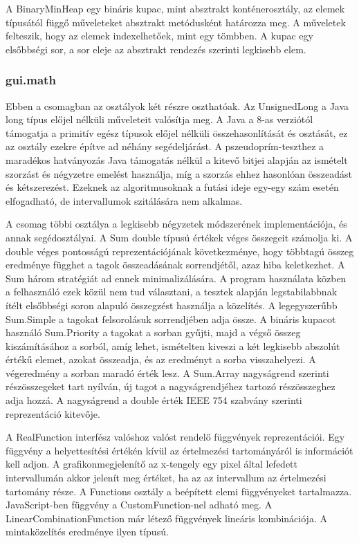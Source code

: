 A BinaryMinHeap egy bináris kupac, mint absztrakt konténerosztály, az elemek típusától függő műveleteket absztrakt metódusként határozza meg.
A műveletek felteszik, hogy az elemek indexelhetőek, mint egy tömbben.
A kupac egy elsőbbségi sor, a sor eleje az absztrakt rendezés szerinti legkisebb elem.

\subsubsection{gui.math}

Ebben a csomagban az osztályok két részre oszthatóak.
Az UnsignedLong a Java long típus előjel nélküli műveleteit valósítja meg.
A Java a 8-as verziótól támogatja a primitív egész típusok előjel nélküli összehasonlítását és osztását, ez az osztály ezekre építve ad néhány segédeljárást.
A pszeudoprím-teszthez a maradékos hatványozás Java támogatás nélkül a kitevő bitjei alapján az ismételt szorzást és négyzetre emelést használja, míg a szorzás ehhez hasonlóan összeadást és kétszerezést. Ezeknek az algoritmusoknak a futási ideje egy-egy szám esetén elfogadható, de intervallumok szitálására nem alkalmas.

A csomag többi osztálya a legkisebb négyzetek módszerének implementációja, és annak segédosztályai.
A Sum double típusú értékek véges összegeit számolja ki.
A double véges pontosságú reprezentációjának következménye, hogy többtagú összeg eredménye függhet a tagok összeadásának sorrendjétől, azaz hiba keletkezhet.
A Sum három stratégiát ad ennek minimalizálására.
A program használata közben a felhasználó ezek közül nem tud választani, {\color{red}a tesztek alapján legstabilabbnak ítélt elsőbbségi soron alapuló} összegzést használja a közelítés.
A legegyszerűbb Sum.Simple a tagokat felsorolásuk sorrendjében adja össze. 
A bináris kupacot használó Sum.Priority a tagokat a sorban gyűjti, majd a végső összeg kiszámításához a sorból, amíg lehet, ismételten kiveszi a két legkisebb abszolút értékű elemet, azokat összeadja, és az eredményt a sorba visszahelyezi. A végeredmény a sorban maradó érték lesz.
A Sum.Array nagyságrend szerinti részösszegeket tart nyílván, új tagot a nagyságrendjéhez tartozó részösszeghez adja hozzá. A nagyságrend a double érték IEEE 754 szabvány szerinti reprezentáció kitevője.

A RealFunction interfész valóshoz valóst rendelő függvények reprezentációi.
Egy függvény a helyettesítési értékén kívül az értelmezési tartományáról is információt kell adjon.
A grafikonmegjelenítő az x-tengely egy pixel által lefedett intervallumán akkor jelenít meg értéket, ha az az intervallum az értelmezési tartomány része.
A Functions osztály a beépített elemi függvényeket tartalmazza.
JavaScript-ben függvény a CustomFunction-nel adható meg.
A LinearCombinationFunction már létező függvények lineáris kombinációja.
A mintaközelítés eredménye ilyen típusú.

